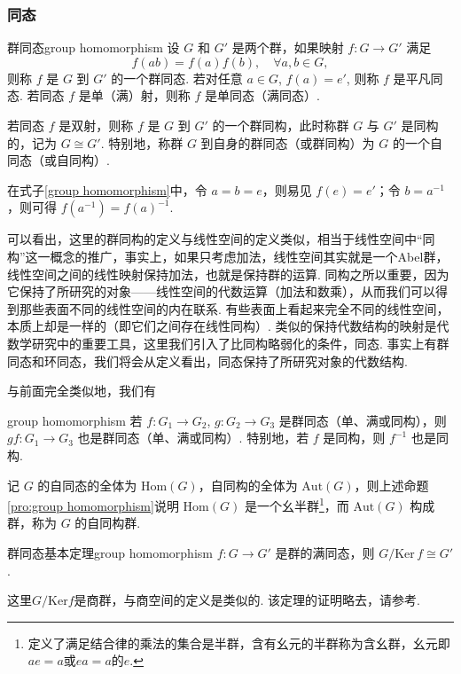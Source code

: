 \documentclass[12pt, a4paper,newtx]{ctexart}
\begin{document}
\subsubsection{同态}\label{section:homomorphism}
\begin{definition}{群同态}{group homomorphism}\kaishu 
	设 $G$ 和 $G'$ 是两个群，如果映射 $f: G \to G'$ 满足
	\begin{equation}\label{group homomorphism}
		f(ab) = f(a)f(b), \quad \forall a, b \in G,
	\end{equation}
	则称 $f$ 是 $G$ 到 $G'$ 的一个{\heiti 群同态}. 若对任意 $a \in G$, $f(a) = e'$, 则称 $f$ 是{\heiti 平凡同态}. 若同态 $f$ 是单（满）射，则称 $f$ 是{\heiti 单同态}（{\heiti 满同态}）. 
	
	若同态 $f$ 是双射，则称 $f$ 是 $G$ 到 $G'$ 的一个{\heiti 群同构}，此时称群 $G$ 与 $G'$ 是{\heiti 同构的}，记为 $G \cong G'$. 特别地，称群 $G$ 到自身的群同态（或群同构）为 $G$ 的一个{\heiti 自同态}（或{\heiti 自同构}）. 
\end{definition}
在式子\eqref{group homomorphism}中，令 $a = b = e$，则易见 $f(e) = e'$；令 $b = a^{-1}$，则可得 $f(a^{-1}) = f(a)^{-1}$. 

可以看出，这里的群同构的定义与线性空间的定义类似，相当于线性空间中“同构”这一概念的推广，事实上，如果只考虑加法，线性空间其实就是一个Abel群，线性空间之间的线性映射保持加法，也就是保持群的运算. 同构之所以重要，因为它保持了所研究的对象——线性空间的代数运算（加法和数乘），从而我们可以得到那些表面不同的线性空间的内在联系. 有些表面上看起来完全不同的线性空间，本质上却是一样的（即它们之间存在线性同构）. 类似的保持代数结构的映射是代数学研究中的重要工具，这里我们引入了比同构略弱化的条件，同态. 事实上有群同态和环同态，我们将会从定义看出，同态保持了所研究对象的代数结构. 

与前面完全类似地，我们有
\begin{proposition}{}{group homomorphism}
	若 $f: G_1 \to G_2$, $g: G_2 \to G_3$ 是群同态（单、满或同构），则 $gf: G_1 \to G_3$ 也是群同态（单、满或同构）. 特别地，若 $f$ 是同构，则 $f^{-1}$ 也是同构. 
\end{proposition}
\begin{definition}{}{}\kaishu 
	记 $G$ 的自同态的全体为 $\text{Hom}(G)$，自同构的全体为 $\text{Aut}(G)$，则上述命题\ref{pro:group homomorphism}说明 $\text{Hom}(G)$ 是一个幺半群\footnote{定义了满足结合律的乘法的集合是半群，含有幺元的半群称为含幺群，幺元即$ae=a$或$ea=a$的$e$.}，而 $\text{Aut}(G)$ 构成群，称为 $G$ 的自同构群. 
\end{definition}
\begin{theorem}{群同态基本定理}{group homomorphism}
	$f: G \to G'$ 是群的满同态，则 $G / \text{Ker} \, f \cong G'$. 
\end{theorem}
这里$G/\mathrm{Ker} f$是商群，与商空间的定义是类似的. 该定理的证明略去，请参考\cite{6}.
\end{document}
